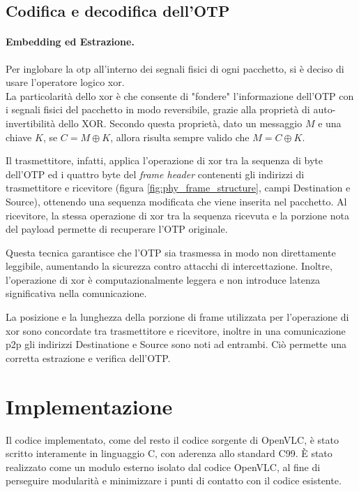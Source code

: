 \subsection{Codifica e decodifica dell'OTP}

\paragraph{Embedding ed Estrazione.}
Per inglobare la \gls{otp} all'interno dei segnali fisici di ogni pacchetto, si è deciso di usare l'operatore logico \gls{xor}.\\
La particolarità dello \gls{xor} è che consente di "fondere" l'informazione dell'OTP con i segnali fisici del pacchetto in modo reversibile, grazie alla proprietà di auto-invertibilità dello XOR. Secondo questa proprietà, dato un messaggio \( M \) e una chiave \( K \), se \( C = M \oplus K \), allora risulta sempre valido che \( M = C \oplus K \).

Il trasmettitore, infatti, applica l'operazione di \gls{xor} tra la sequenza di byte dell'OTP ed i quattro byte del \textit{frame header} contenenti gli indirizzi di trasmettitore e ricevitore (figura \ref{fig:phy_frame_structure}, campi Destination e Source), ottenendo una sequenza modificata che viene inserita nel pacchetto. Al ricevitore, la stessa operazione di \gls{xor} tra la sequenza ricevuta e la porzione nota del payload permette di recuperare l'OTP originale.

Questa tecnica garantisce che l'OTP sia trasmessa in modo non direttamente leggibile, aumentando la sicurezza contro attacchi di intercettazione. Inoltre, l'operazione di \gls{xor} è computazionalmente leggera e non introduce latenza significativa nella comunicazione.

La posizione e la lunghezza della porzione di frame utilizzata per l'operazione di \gls{xor} sono concordate tra trasmettitore e ricevitore, inoltre in una comunicazione \gls{p2p} gli indirizzi Destinatione e Source sono noti ad entrambi. Ciò permette una corretta estrazione e verifica dell'OTP.


\section{Implementazione}
Il codice implementato, come del resto il codice sorgente di OpenVLC, è stato scritto interamente in linguaggio C, con aderenza allo standard C99. È stato realizzato come un modulo esterno isolato dal codice OpenVLC, al fine di perseguire modularità e minimizzare i punti di contatto con il codice esistente.

